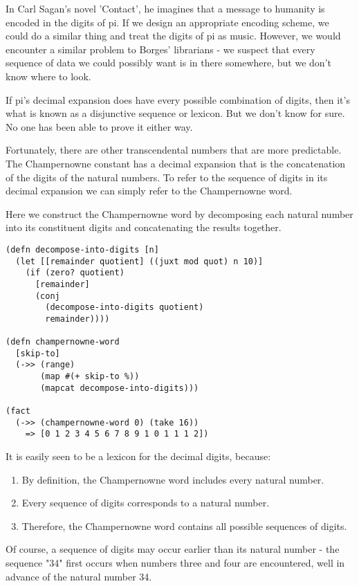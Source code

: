 \documentclass[numbers]{sigplanconf}
\begin{document}
In Carl Sagan's novel 'Contact'\cite{Contact}, he imagines that a message to humanity is encoded in the digits of pi.
If we design an appropriate encoding scheme, we could do a similar thing and treat the digits of pi as music. However,
we would encounter a similar problem to Borges' librarians - we suspect that every sequence of data we could possibly want
is in there somewhere, but we don't know where to look.

If pi's decimal expansion does have every possible combination of digits, then it's what is known as a disjunctive
sequence or lexicon. But we don't know for sure. No one has been able to prove it either way.

Fortunately, there are other transcendental numbers that are more predictable. The Champernowne constant has a
decimal expansion that is the concatenation of the digits of the natural numbers. To refer to the sequence of digits
in its decimal expansion we can simply refer to the Champernowne word.

Here we construct the Champernowne word by decomposing each natural number into its constituent digits and concatenating
the results together.

\begin{verbatim}
(defn decompose-into-digits [n]
  (let [[remainder quotient] ((juxt mod quot) n 10)]
    (if (zero? quotient)
      [remainder]
      (conj
        (decompose-into-digits quotient)
        remainder))))

(defn champernowne-word
  [skip-to]
  (->> (range)
       (map #(+ skip-to %))
       (mapcat decompose-into-digits)))

(fact
  (->> (champernowne-word 0) (take 16))
    => [0 1 2 3 4 5 6 7 8 9 1 0 1 1 1 2])
\end{verbatim}

It is easily seen to be a lexicon for the decimal digits, because:
\begin{enumerate}
    \item By definition, the Champernowne word includes every natural number.
    \item Every sequence of digits corresponds to a natural number.
    \item Therefore, the Champernowne word contains all possible sequences of digits.
\end{enumerate}
Of course, a sequence of digits may occur earlier than its natural number - the sequence "34" first occurs when numbers three and
four are encountered, well in advance of the natural number 34.
\end{document}
